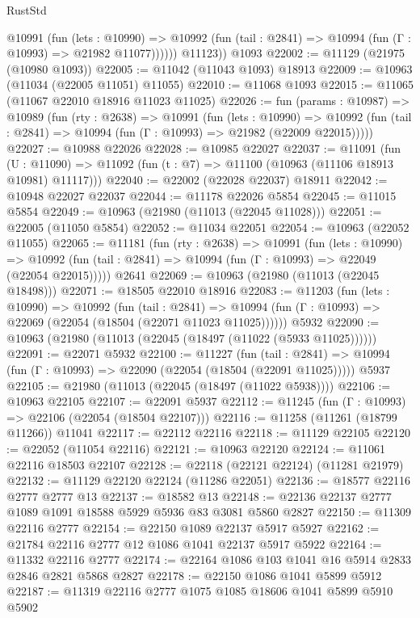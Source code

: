 \begin{lexlean}{RustStd}
\begin{coremodule}
            @10991
              (fun (lets : @10990) =>
              @10992 (fun (tail : @2841) => @10994 (fun (Γ : @10993) => @21982 @11077))))))
        @11123))
    @1093
@22002 := @11129 (@21975 (@10980 @1093))
@22005 := @11042 (@11043 @1093) @18913
@22009 := @10963 (@11034 (@22005 @11051) @11055)
@22010 := @11068 @1093
@22015 := @11065 (@11067 @22010 @18916 @11023 @11025)
@22026 := fun (params : @10987) =>
  @10989
    (fun (rty : @2638) =>
    @10991
      (fun (lets : @10990) =>
      @10992 (fun (tail : @2841) => @10994 (fun (Γ : @10993) => @21982 (@22009 @22015)))))
@22027 := @10988 @22026
@22028 := @10985 @22027
@22037 := @11091
    (fun (U : @11090) => @11092 (fun (t : @7) => @11100 (@10963 (@11106 @18913 @10981) @11117)))
@22040 := @22002 (@22028 @22037) @18911
@22042 := @10948 @22027 @22037
@22044 := @11178 @22026 @5854
@22045 := @11015 @5854
@22049 := @10963 (@21980 (@11013 (@22045 @11028)))
@22051 := @22005 (@11050 @5854)
@22052 := @11034 @22051
@22054 := @10963 (@22052 @11055)
@22065 := @11181
    (fun (rty : @2638) =>
    @10991
      (fun (lets : @10990) =>
      @10992 (fun (tail : @2841) => @10994 (fun (Γ : @10993) => @22049 (@22054 @22015)))))
    @2641
@22069 := @10963 (@21980 (@11013 (@22045 @18498)))
@22071 := @18505 @22010 @18916
@22083 := @11203
    (fun (lets : @10990) =>
    @10992
      (fun (tail : @2841) =>
      @10994 (fun (Γ : @10993) => @22069 (@22054 (@18504 (@22071 @11023 @11025))))))
    @5932
@22090 := @10963 (@21980 (@11013 (@22045 (@18497 (@11022 (@5933 @11025))))))
@22091 := @22071 @5932
@22100 := @11227
    (fun (tail : @2841) => @10994 (fun (Γ : @10993) => @22090 (@22054 (@18504 (@22091 @11025)))))
    @5937
@22105 := @21980 (@11013 (@22045 (@18497 (@11022 @5938))))
@22106 := @10963 @22105
@22107 := @22091 @5937
@22112 := @11245 (fun (Γ : @10993) => @22106 (@22054 (@18504 @22107)))
@22116 := @11258 (@11261 (@18799 @11266)) @11041
@22117 := @22112 @22116
@22118 := @11129 @22105
@22120 := @22052 (@11054 @22116)
@22121 := @10963 @22120
@22124 := @11061 @22116 @18503 @22107
@22128 := @22118 (@22121 @22124) (@11281 @21979)
@22132 := @11129 @22120 @22124 (@11286 @22051)
@22136 := @18577 @22116 @2777 @2777 @13
@22137 := @18582 @13
@22148 := @22136 @22137 @2777 @1089 @1091 @18588 @5929 @5936 @83 @3081 @5860 @2827
@22150 := @11309 @22116 @2777
@22154 := @22150 @1089 @22137 @5917 @5927
@22162 := @21784 @22116 @2777 @12 @1086 @1041 @22137 @5917 @5922
@22164 := @11332 @22116 @2777
@22174 := @22164 @1086 @103 @1041 @16 @5914 @2833 @2846 @2821 @5868 @2827
@22178 := @22150 @1086 @1041 @5899 @5912
@22187 := @11319 @22116 @2777 @1075 @1085 @18606 @1041 @5899 @5910 @5902

\end{coremodule}
\end{lexlean}
